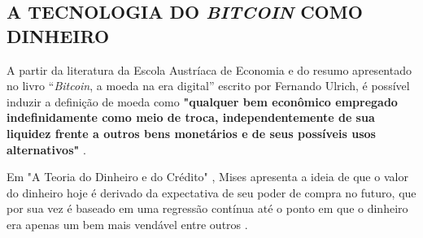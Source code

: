 \documentclass[article,12pt,oneside,a4paper,english,brazil]{unifil}
\begin{document}
\begin{Spacing}{1.5}



\section*{A TECNOLOGIA DO \textit{BITCOIN} COMO DINHEIRO} \label{sec:dinheiro}
A partir da literatura da Escola Austríaca de Economia e do resumo apresentado no livro ``\textit{Bitcoin}, a moeda na era digital'' escrito por Fernando Ulrich, é possível induzir a definição de moeda como \textbf{"qualquer bem econômico empregado indefinidamente como meio de troca, independentemente de sua liquidez frente a outros bens monetários e de seus possíveis usos alternativos"} \cite[P.89]{Ulrich2014}. 

Em "A Teoria do Dinheiro e do Crédito" \cite{von2013theory}, Mises apresenta a ideia de que o valor do dinheiro hoje é derivado da expectativa de seu poder de compra no futuro, que por sua vez é baseado em uma regressão contínua até o ponto em que o dinheiro era apenas um bem mais vendável entre outros \cite{von2013theory}. 


\end{Spacing}
\end{document}
